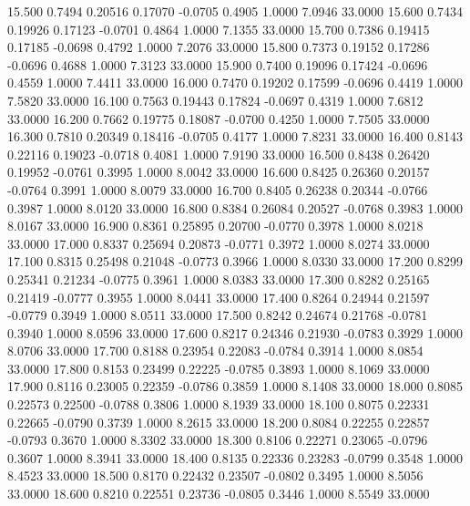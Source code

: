   15.500   0.7494   0.20516   0.17070  -0.0705   0.4905   1.0000   7.0946  33.0000
  15.600   0.7434   0.19926   0.17123  -0.0701   0.4864   1.0000   7.1355  33.0000
  15.700   0.7386   0.19415   0.17185  -0.0698   0.4792   1.0000   7.2076  33.0000
  15.800   0.7373   0.19152   0.17286  -0.0696   0.4688   1.0000   7.3123  33.0000
  15.900   0.7400   0.19096   0.17424  -0.0696   0.4559   1.0000   7.4411  33.0000
  16.000   0.7470   0.19202   0.17599  -0.0696   0.4419   1.0000   7.5820  33.0000
  16.100   0.7563   0.19443   0.17824  -0.0697   0.4319   1.0000   7.6812  33.0000
  16.200   0.7662   0.19775   0.18087  -0.0700   0.4250   1.0000   7.7505  33.0000
  16.300   0.7810   0.20349   0.18416  -0.0705   0.4177   1.0000   7.8231  33.0000
  16.400   0.8143   0.22116   0.19023  -0.0718   0.4081   1.0000   7.9190  33.0000
  16.500   0.8438   0.26420   0.19952  -0.0761   0.3995   1.0000   8.0042  33.0000
  16.600   0.8425   0.26360   0.20157  -0.0764   0.3991   1.0000   8.0079  33.0000
  16.700   0.8405   0.26238   0.20344  -0.0766   0.3987   1.0000   8.0120  33.0000
  16.800   0.8384   0.26084   0.20527  -0.0768   0.3983   1.0000   8.0167  33.0000
  16.900   0.8361   0.25895   0.20700  -0.0770   0.3978   1.0000   8.0218  33.0000
  17.000   0.8337   0.25694   0.20873  -0.0771   0.3972   1.0000   8.0274  33.0000
  17.100   0.8315   0.25498   0.21048  -0.0773   0.3966   1.0000   8.0330  33.0000
  17.200   0.8299   0.25341   0.21234  -0.0775   0.3961   1.0000   8.0383  33.0000
  17.300   0.8282   0.25165   0.21419  -0.0777   0.3955   1.0000   8.0441  33.0000
  17.400   0.8264   0.24944   0.21597  -0.0779   0.3949   1.0000   8.0511  33.0000
  17.500   0.8242   0.24674   0.21768  -0.0781   0.3940   1.0000   8.0596  33.0000
  17.600   0.8217   0.24346   0.21930  -0.0783   0.3929   1.0000   8.0706  33.0000
  17.700   0.8188   0.23954   0.22083  -0.0784   0.3914   1.0000   8.0854  33.0000
  17.800   0.8153   0.23499   0.22225  -0.0785   0.3893   1.0000   8.1069  33.0000
  17.900   0.8116   0.23005   0.22359  -0.0786   0.3859   1.0000   8.1408  33.0000
  18.000   0.8085   0.22573   0.22500  -0.0788   0.3806   1.0000   8.1939  33.0000
  18.100   0.8075   0.22331   0.22665  -0.0790   0.3739   1.0000   8.2615  33.0000
  18.200   0.8084   0.22255   0.22857  -0.0793   0.3670   1.0000   8.3302  33.0000
  18.300   0.8106   0.22271   0.23065  -0.0796   0.3607   1.0000   8.3941  33.0000
  18.400   0.8135   0.22336   0.23283  -0.0799   0.3548   1.0000   8.4523  33.0000
  18.500   0.8170   0.22432   0.23507  -0.0802   0.3495   1.0000   8.5056  33.0000
  18.600   0.8210   0.22551   0.23736  -0.0805   0.3446   1.0000   8.5549  33.0000
